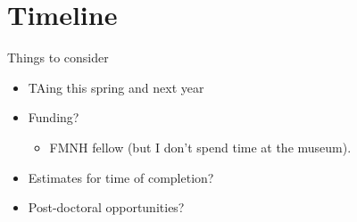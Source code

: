 \documentclass{beamer}
\begin{document}
\section{Timeline}
\begin{frame}
  \begin{block}{Things to consider}
    \begin{itemize}
      \item TAing this spring and next year
      \item Funding?
        \begin{itemize}
          \item FMNH fellow (but I don't spend time at the museum).
        \end{itemize}
      \item Estimates for time of completion?
      \item Post-doctoral opportunities?
    \end{itemize}
  \end{block}
\end{frame}
\end{document}
